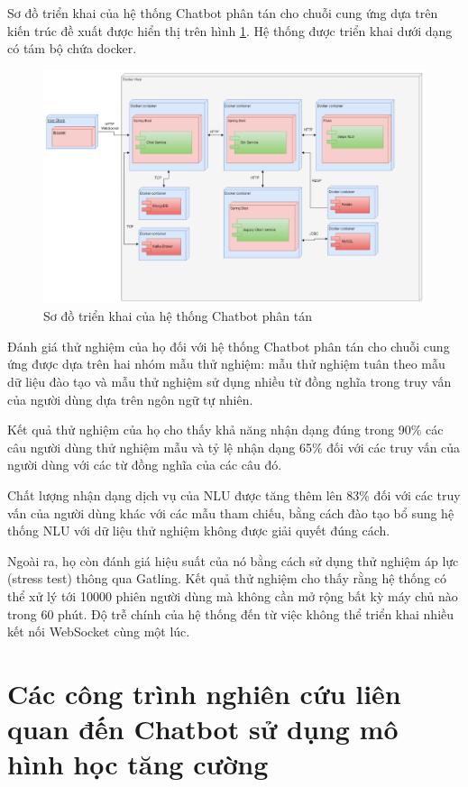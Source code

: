 Sơ đồ triển khai của hệ thống Chatbot phân tán cho chuỗi cung ứng
dựa trên kiến trúc đề xuất được hiển thị trên hình
\ref{fig:commercediagram}.
Hệ thống được triển khai dưới dạng có tám bộ chứa docker.

\begin{figure}[ht]
    \centering
    \includegraphics[width=1\textwidth]{thesis/chatbot/congtrinh/img/commerce_diagram.png}
    \caption{Sơ đồ triển khai của hệ thống Chatbot phân tán}
    \label{fig:commercediagram}
\end{figure}

Đánh giá thử nghiệm của họ đối với hệ thống Chatbot phân tán cho
chuỗi cung ứng được dựa trên hai nhóm mẫu thử nghiệm: mẫu thử nghiệm
tuân theo mẫu dữ liệu đào tạo và mẫu thử nghiệm sử dụng nhiều từ
đồng nghĩa trong truy vấn của người dùng dựa trên ngôn ngữ tự nhiên.

Kết quả thử nghiệm của họ cho thấy khả năng nhận dạng đúng trong 90\%
các câu người dùng thử nghiệm mẫu và tỷ lệ nhận dạng 65\% đối với các
truy vấn của người dùng với các từ đồng nghĩa của các câu đó.

Chất lượng nhận dạng dịch vụ của NLU được tăng thêm lên 83\% đối với
các truy vấn của người dùng khác với các mẫu tham chiếu, bằng cách
đào tạo bổ sung hệ thống NLU với dữ liệu thử nghiệm không được
giải quyết đúng cách.

Ngoài ra, họ còn đánh giá hiệu suất của nó bằng cách sử dụng thử nghiệm
áp lực (stress test) thông qua Gatling. Kết quả thử nghiệm cho thấy rằng
hệ thống có thể xử lý tới 10000 phiên người dùng mà không cần mở rộng
bất kỳ máy chủ nào trong 60 phút. Độ trễ chính của hệ thống đến từ
việc không thể triển khai nhiều kết nối WebSocket cùng một lúc.

\section{Các công trình nghiên cứu liên quan đến Chatbot sử dụng
mô hình học tăng cường}

